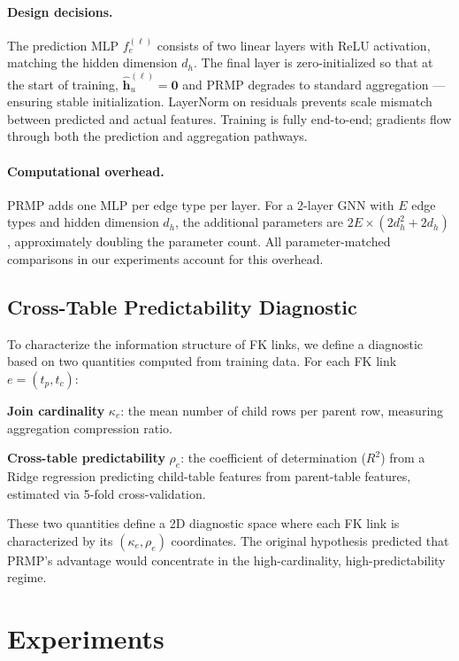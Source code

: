 \documentclass[11pt,letterpaper]{article}
\begin{document}
\paragraph{Design decisions.} The prediction MLP $f_e^{(\ell)}$ consists of two linear layers with ReLU activation, matching the hidden dimension $d_h$. The final layer is zero-initialized so that at the start of training, $\hat{\mathbf{h}}_u^{(\ell)} = \mathbf{0}$ and PRMP degrades to standard aggregation --- ensuring stable initialization. LayerNorm on residuals prevents scale mismatch between predicted and actual features. Training is fully end-to-end; gradients flow through both the prediction and aggregation pathways.

\paragraph{Computational overhead.} PRMP adds one MLP per edge type per layer. For a 2-layer GNN with $E$ edge types and hidden dimension $d_h$, the additional parameters are $2E \times (2d_h^2 + 2d_h)$, approximately doubling the parameter count. All parameter-matched comparisons in our experiments account for this overhead.

\subsection{Cross-Table Predictability Diagnostic}

To characterize the information structure of FK links, we define a diagnostic based on two quantities computed from training data. For each FK link $e = (t_p, t_c)$:

\textbf{Join cardinality} $\kappa_e$: the mean number of child rows per parent row, measuring aggregation compression ratio.

\textbf{Cross-table predictability} $\rho_e$: the coefficient of determination ($R^2$) from a Ridge regression predicting child-table features from parent-table features, estimated via 5-fold cross-validation.

These two quantities define a 2D diagnostic space where each FK link is characterized by its $(\kappa_e, \rho_e)$ coordinates. The original hypothesis predicted that PRMP's advantage would concentrate in the high-cardinality, high-predictability regime.

\section{Experiments}
\label{sec:experiments}
\end{document}
